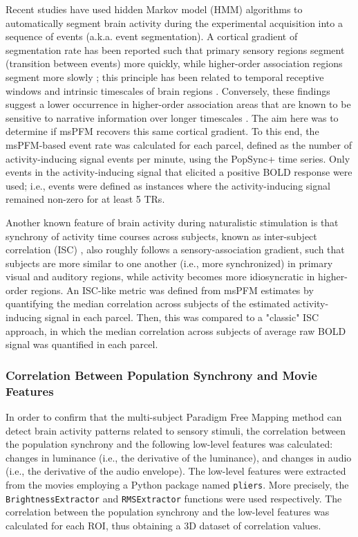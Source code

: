 Recent studies have used hidden Markov model (HMM) algorithms to automatically
segment brain activity during the experimental acquisition into a sequence of
events (a.k.a. event segmentation). A cortical gradient of segmentation rate has
been reported such that primary sensory regions segment (transition between
events) more quickly, while higher-order association regions segment more slowly
\citep{Baldassano2017DiscoveringEventStructure,
Geerligs2022partiallynestedcortical}; this principle has been related to
temporal receptive windows and intrinsic timescales of brain regions
\citep{Murray2014hierarchyintrinsictimescales,Hasson2008HierarchyTemporalReceptive}.
Conversely, these findings suggest a lower occurrence in higher-order
association areas that are known to be sensitive to narrative information over
longer timescales \citep{Lerner2011TopographicMappingHierarchy,
Honey2012SlowCorticalDynamics}. The aim here was to determine if msPFM recovers
this same cortical gradient. To this end, the msPFM-based event rate was
calculated for each parcel, defined as the number of activity-inducing signal
events per minute, using the PopSync+ time series. Only events in the
activity-inducing signal that elicited a positive BOLD response were used; i.e.,
events were defined as instances where the activity-inducing signal remained
non-zero for at least 5 TRs.

Another known feature of brain activity during naturalistic stimulation is that
synchrony of activity time courses across subjects, known as inter-subject
correlation (ISC) \citep{Hasson2004IntersubjectSynchronizationCortical,
Nastase2019Measuringsharedresponses, Finn2020Idiosynchronysharedresponses}, also
roughly follows a sensory-association gradient, such that subjects are more
similar to one another (i.e., more synchronized) in primary visual and auditory
regions, while activity becomes more idiosyncratic in higher-order regions. An
ISC-like metric was defined from msPFM estimates by quantifying the
median correlation across subjects of the estimated activity-inducing signal in
each parcel. Then, this was compared to a "classic" ISC approach, in which the
median correlation across subjects of average raw BOLD signal was quantified in
each parcel.

\subsubsection*{Correlation Between Population Synchrony and Movie Features}

In order to confirm that the multi-subject Paradigm Free Mapping method can detect
brain activity patterns related to sensory stimuli, the correlation between the
population synchrony and the following low-level features was calculated:
changes in luminance (i.e., the derivative of the luminance), and changes in
audio (i.e., the derivative of the audio envelope). The low-level features were
extracted from the movies employing a Python package named \texttt{pliers}. More
precisely, the \texttt{BrightnessExtractor} and \texttt{RMSExtractor} functions
were used respectively. The correlation between the population synchrony and the
low-level features was calculated for each ROI, thus obtaining a 3D dataset of
correlation values.


